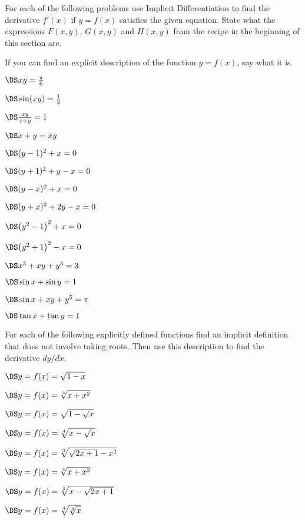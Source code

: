 \begin{multicols}{2}
\setlength{\parindent}{0pt}
For each of the following problems use Implicit Differentiation to
find the derivative $f'(x)$ if $y=f(x)$ satisfies the given equation.
State what the expressions $F(x, y)$, $G(x, y)$ and $H(x, y)$ from the
recipe in the beginning of this section are.

If you can find an explicit description of the function $y=f(x)$, say
what it is.



\problem $\DS xy=\frac\pi6$

\problem $\DS \sin(xy)=\tfrac12 $

\problem $\DS \frac{xy}{x+y}=1 $

\problem $\DS x+y=xy $

\problem $\DS (y-1)^2 + x = 0$

\problem $\DS (y+1)^2 + y - x = 0$

\problem $\DS (y-x)^2 + x = 0$

\problem $\DS (y+x)^2 + 2y - x = 0$

\problem $\DS \bigl(y^2-1 \bigr)^2 + x = 0$

\problem $\DS \bigl(y^2+1 \bigr)^2 - x = 0$

\problem $\DS x^3+xy+y^3=3 $

\problem $\DS \sin x +\sin y = 1 $

\problem $\DS \sin x + xy+y^5=\pi $

\problem $\DS \tan x +\tan y = 1 $

For each of the following explicitly defined functions find an implicit
definition that does not involve taking roots.  Then use this description to
find the derivative $dy/dx$.

\problem $\DS y=f(x) = \sqrt{1-x} $

\problem $\DS y=f(x) = \sqrt[4]{x+x^2} $

\problem $\DS y=f(x) = \sqrt{1-\surd x} $

\problem $\DS y=f(x) = \sqrt[4]{x-\surd x} $

\problem $\DS y=f(x) = \sqrt[3]{\sqrt{2x+1}-x^2} $

\problem $\DS y=f(x) = \sqrt[4]{x+x^2} $

\problem $\DS y=f(x) = \sqrt[3]{x-\sqrt{2x+1}} $

\problem $\DS y=f(x) = \sqrt[4]{\sqrt[3]{x}}$



\end{multicols}
